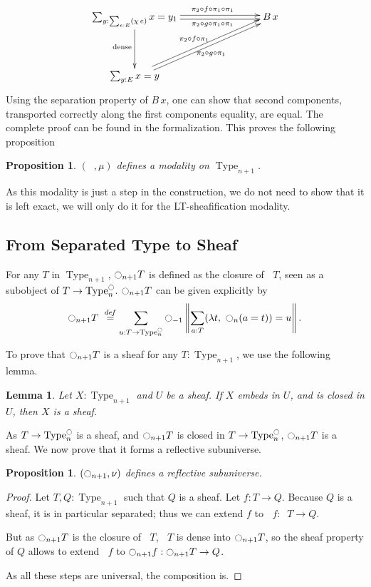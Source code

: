 \documentclass[preprint,9pt,numbers]{sigplanconf}
\newtheorem{prop}[thm]{Proposition}
\newtheorem{lem}[thm]{Lemma}
\newcommand \defeq {\overset{de\hspace{-0.2ex}f}{=}}
\newcommand{\mynote}[2]{
    \fbox{\bfseries\sffamily\scriptsize#1}
    {\small$\blacktriangleright$\textsf{\emph{#2}}$\blacktriangleleft$}~}
\newcommand\nt[1]{\mynote{NT}{#1}}
\DeclareMathOperator{\Type}{Type}
\newcommand{\modal}{\ensuremath{\ocircle}}
\newcommand \separated {\mathop{\square_{n+1}} }
\newenvironment{mymath}[1][-0em]{%
  \newcommand\mymathaux{\vspace{#1}}%
  \vspace{#1}%
  \begin{equation*}%
  }{ %
    \mymathaux%
  \end{equation*}}
\begin{document}
\begin{mymath}\xymatrix@C=8em@R=4em{
  \sum_{y:\sum_{e:E} (\chi\,
  e)} x=y_1 \ar@<2pt>[r]^{\qquad \pi_2\circ f\circ\pi_1\circ \pi_1}
\ar@<-2pt>[r]_{\qquad \pi_2\circ g\circ \pi_1\circ \pi_1}
\ar[d]_{\mathrm{dense}}& B\,x \\
  \sum_{y:E} x = y \ar@<2pt>[ur]^{\pi_2\circ f\circ \pi_1} \ar@<-2pt>[ur]_{\pi_2\circ g\circ \pi_1}&
}\end{mymath}%
Using the separation property of $B\,x$, one can show that second
components, transported correctly along the first components equality,
are equal. The complete proof can be found in the formalization.
This proves the following proposition
\begin{prop}\label{prop:sep-mod}
  $(\separated,\mu)$ defines a modality on $\Type_{n+1}$.
\end{prop}

As this modality is just a step in the construction, we do not need to
show that it is left exact, we will only do it for the LT-sheafification
modality.

\subsection{From Separated Type to Sheaf}
\label{ssec:separated-to-sheaf}

For any $T$ in $\Type_{n+1}$, 
$\modal_{n+1}T$ is defined as the closure of $\separated T$,
seen as a subobject of $T \to \Type_n^\modal$. 
%
$\modal_{n+1}T$ can be given explicitly by
\begin{mymath}
\modal_{n+1} T \ \defeq \sum_{u:T \to \Type_n^\modal} \modal_{-1}\left\| \sum_{a:T} 
            (\lambda t,~\modal_n (a=t)) = u\right\|.
\end{mymath}%

To prove that $\modal_{n+1} T$ is a sheaf for any $T:\Type_{n+1}$, we
use the following lemma.
\begin{lem}
  Let $X:\Type_{n+1}$ and $U$ be a sheaf. If $X$ embeds
  in $U$, and is closed in $U$, then $X$ is a sheaf.
\end{lem}

As $T\to \Type_n^\modal$ is a sheaf, and $\modal_{n+1}T$ is closed in
$T\to \Type_n^\modal$, $\modal_{n+1}T$ is a sheaf. We now prove that
it forms a reflective subuniverse.

\begin{prop}
  $(\modal_{n+1},\nu)$ defines a reflective subuniverse.
\end{prop}
\begin{proof}
  Let $T,Q:\Type_{n+1}$ such that $Q$ is a sheaf. Let $f:T\to Q$.
  Because $Q$ is a sheaf, it is in particular separated;
  thus we can extend $f$ to $\separated f:\separated T\to Q$.

  But as $\modal_{n+1} T$ is the closure of $\separated T$, $\separated T$ is dense
  into $\modal_{n+1} T$, so the sheaf property of $Q$ allows to extend
  $\separated f$ to $\modal_{n+1} f:\modal_{n+1} T \to Q$.

  As all these steps are universal, the composition is.
\end{proof}
\end{document}
